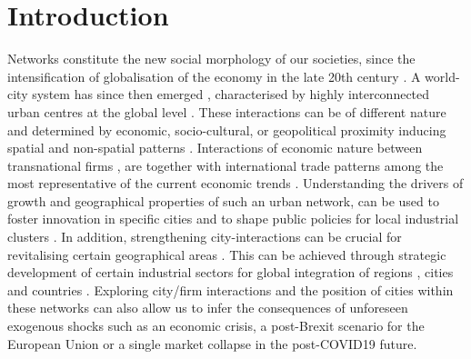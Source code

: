 \documentclass[10pt,letterpaper]{article}
\begin{document}
\linenumbers



\section*{Introduction}

Networks constitute the new social morphology of our societies, since the intensification of globalisation of the economy in the late 20th century \cite{castells2000networksociety}. A world-city system has since then emerged \cite{taylor2001specification}, characterised by highly interconnected urban centres at the global level \cite{Sassen1991}. These interactions can be of different nature and determined by economic, socio-cultural, or geopolitical proximity inducing spatial and non-spatial patterns \cite{martinus2018global}. Interactions of economic nature between transnational firms \cite{derudder2018central}, are together with international trade patterns among the most representative of the current economic trends \cite{taylor2001specification}. Understanding the drivers of growth and geographical properties of such an urban network, can be used to foster innovation in specific cities and to shape public policies for local industrial clusters \cite{turkina2016structure}. In addition, strengthening city-interactions can be crucial for revitalising certain geographical areas \cite{Clarke2018}. This can be achieved through strategic development of certain industrial sectors for global integration of regions \cite{dawley2019creating}, cities \cite{gluckler2016relational} and countries \cite{martinus2019brokerage}. Exploring city/firm interactions \cite{storme2019introducing} and the position of cities within these networks \cite{gluckler2016relational} can also allow us to infer the consequences of unforeseen exogenous shocks such as an economic crisis, a post-Brexit scenario for the European Union or a single market collapse in the post-COVID19 future.
\end{document}
